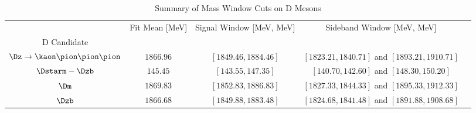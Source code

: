 \begin{table}
\centering
\caption{Summary of Mass Window Cuts on D Mesons}
\label{tab:dwindows}
\begin{tabular}{ccccc}
\toprule
{} & Fit Mean [MeV] & Signal Window [MeV, MeV] &                     Sideband Window [MeV, MeV] \\
D Candidate                          &                &                          &                                                \\
\midrule
$\Dz\rightarrow\kaon\pion\pion\pion$ &      $1866.96$ &     $[1849.46, 1884.46]$ &  $[1823.21, 1840.71]$ and $[1893.21, 1910.71]$ \\
$\Dstarm - \Dzb$                     &       $145.45$ &       $[143.55, 147.35]$ &      $[140.70, 142.60]$ and $[148.30, 150.20]$ \\
$\Dm$                                &      $1869.83$ &     $[1852.83, 1886.83]$ &  $[1827.33, 1844.33]$ and $[1895.33, 1912.33]$ \\
$\Dzb$                               &      $1866.68$ &     $[1849.88, 1883.48]$ &  $[1824.68, 1841.48]$ and $[1891.88, 1908.68]$ \\
\bottomrule
\end{tabular}
\end{table}
